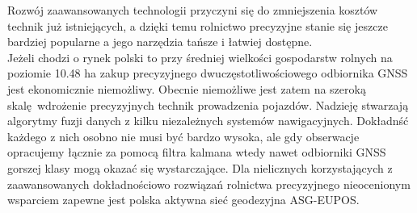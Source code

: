 Rozwój zaawansowanych technologii przyczyni się do zmniejszenia kosztów technik już istniejących, a dzięki temu rolnictwo precyzyjne stanie się jeszcze bardziej 
popularne a jego narzędzia tańsze i łatwiej dostępne.\\
\indent Jeżeli chodzi o rynek polski to przy średniej wielkości gospodarstw rolnych na poziomie 10.48 ha \cite[]{ARIMR} zakup 
precyzyjnego dwuczęstotliwościowego odbiornika GNSS jest ekonomicznie niemożliwy. Obecnie niemożliwe jest zatem na szeroką skalę wdrożenie precyzyjnych technik 
prowadzenia pojazdów. Nadzieję stwarzają algorytmy fuzji danych z kilku niezależnych systemów nawigacyjnych. Dokładnść każdego z nich osobno nie musi być bardzo wysoka,
ale gdy obserwacje opracujemy łącznie za pomocą filtra kalmana wtedy nawet odbiorniki GNSS gorszej klasy mogą okazać się wystarczające.
Dla nielicznych korzystających z zaawansowanych dokładnościowo rozwiązań rolnictwa precyzyjnego nieocenionym wsparciem zapewne jest polska aktywna sieć 
geodezyjna ASG-EUPOS.


